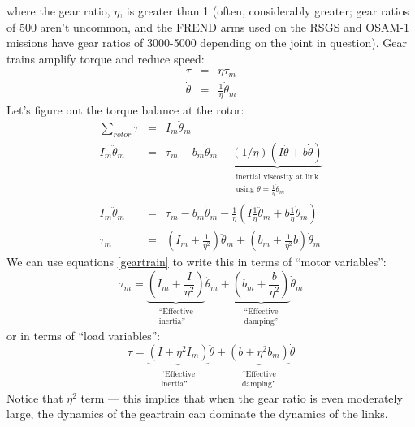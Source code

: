 \documentclass[]{article}
\begin{document}
\noindent
where the gear ratio, $\eta$, is greater than 1 (often, considerably greater; gear ratios of 500 aren't uncommon, and the FREND arms used on the RSGS and OSAM-1 missions have gear ratios of 3000-5000 depending on the joint in question). Gear trains amplify torque and reduce speed:
\begin{eqnarray}
	\tau & = & \eta \tau_m \nonumber \\
	\dot{\theta} & = & \frac{1}{\eta} \dot{\theta}_{m} \label{geartrain}
\end{eqnarray}
Let's figure out the torque balance at the rotor:
\begin{eqnarray}
	\sum_{rotor} \tau & = & I_{m}\ddot{\theta}_{m} \nonumber \\
	I_{m}\ddot{\theta}_{m}  & = & \tau_{m} - b_{m}\dot{\theta}_{m} - \underbrace{(1/\eta)(I\ddot{\theta} + b\dot{\theta})}_{\substack{\text{inertial viscosity at link}\\\text{using }\dot{\theta} = \frac{1}{\eta}\dot{\theta}_{m}}} \nonumber \\
	I_{m}\ddot{\theta}_{m}  & = & \tau_{m} - b_{m}\dot{\theta}_{m} - \frac{1}{\eta}(I\frac{1}{\eta}\ddot{\theta}_{m} + b\frac{1}{\eta}\dot{\theta}_{m}) \nonumber \\
	\tau_{m} & = & (I_{m} + \frac{1}{\eta^{2}})\ddot{\theta}_{m} + (b_{m}+\frac{1}{\eta^{2}}b)\dot{\theta}_{m} \nonumber
\end{eqnarray}
We can use equations \ref{geartrain} to write this in terms of ``motor variables'':
\begin{displaymath}
	\tau_{m} = \underbrace{\left( I_{m} + \frac{I}{\eta^{2}}\right)}_{\substack{\text{``Effective}\\\text{inertia''}}}\!\ddot{\theta}_{m} + \underbrace{\left(b_{m} + \frac{b}{\eta^{2}}\right)}_{\substack{\text{``Effective}\\\text{damping''}}}\!\dot{\theta}_{m}
\end{displaymath}
or in terms of ``load variables'':
\begin{displaymath}
	\tau = \underbrace{\left( I + \eta^{2}I_{m}\right)}_{\substack{\text{``Effective}\\\text{inertia''}}}\ddot{\theta} + \underbrace{\left(b + \eta^{2}b_{m}\right)}_{\substack{\text{``Effective}\\\text{damping''}}}\dot{\theta}
\end{displaymath}
Notice that $\eta^{2}$ term --- this implies that when the gear ratio is even moderately large, the dynamics of the geartrain can dominate the dynamics of the links.
\end{document}
